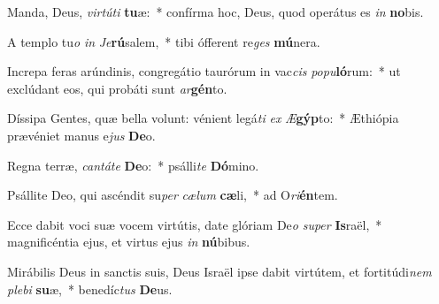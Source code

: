 \item Manda, Deus, \textit{vir}\textit{tú}\textit{ti} \textbf{tu}æ:~* confírma hoc, Deus, quod operátus es \textit{in} \textbf{no}bis.
\item A templo tu\textit{o} \textit{in} \textit{Je}\textbf{rú}salem,~* tibi ófferent re\textit{ges} \textbf{mú}nera.
\item Increpa feras arúndinis, congregátio taurórum in vac\textit{cis} \textit{po}\textit{pu}\textbf{ló}rum:~* ut exclúdant eos, qui probáti sunt \textit{ar}\textbf{gén}to.
\item Díssipa Gentes, quæ bella volunt: vénient legá\textit{ti} \textit{ex} \textit{Æ}\textbf{gýp}to:~* Æthiópia prævéniet manus e\textit{jus} \textbf{De}o.
\item Regna terræ, \textit{can}\textit{tá}\textit{te} \textbf{De}o:~* psálli\textit{te} \textbf{Dó}mino.
\item Psállite Deo, qui ascéndit su\textit{per} \textit{cæ}\textit{lum} \textbf{cæ}li,~* ad O\textit{ri}\textbf{én}tem.
\item Ecce dabit voci suæ vocem virtútis, date glóriam De\textit{o} \textit{su}\textit{per} \textbf{Is}raël,~* magnificéntia ejus, et virtus ejus \textit{in} \textbf{nú}bibus.
\item Mirábilis Deus in sanctis suis, Deus Israël ipse dabit virtútem, et fortitúdi\textit{nem} \textit{ple}\textit{bi} \textbf{su}æ,~* benedíc\textit{tus} \textbf{De}us.
